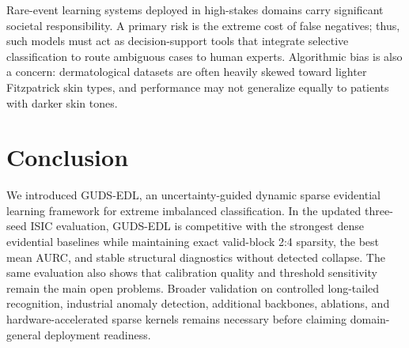 \documentclass[letterpaper]{article} %
\begin{document}
Rare-event learning systems deployed in high-stakes domains carry significant societal responsibility. A primary risk is the extreme cost of false negatives; thus, such models must act as decision-support tools that integrate selective classification to route ambiguous cases to human experts. Algorithmic bias is also a concern: dermatological datasets are often heavily skewed toward lighter Fitzpatrick skin types, and performance may not generalize equally to patients with darker skin tones.

\section{Conclusion}\label{sec:conclusion}
We introduced GUDS-EDL, an uncertainty-guided dynamic sparse evidential learning framework for extreme imbalanced classification. In the updated three-seed ISIC evaluation, GUDS-EDL is competitive with the strongest dense evidential baselines while maintaining exact valid-block 2:4 sparsity, the best mean AURC, and stable structural diagnostics without detected collapse. The same evaluation also shows that calibration quality and threshold sensitivity remain the main open problems. Broader validation on controlled long-tailed recognition, industrial anomaly detection, additional backbones, ablations, and hardware-accelerated sparse kernels remains necessary before claiming domain-general deployment readiness.
\end{document}
